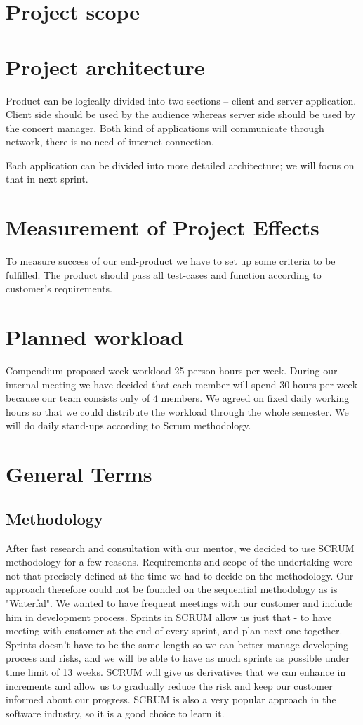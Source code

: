 \documentclass{article}
\begin{document}
\section{Project scope}


\section{Project architecture}
Product can be logically divided into two sections -- client and server application.
Client side should be used by the audience whereas server side should be used by the concert manager.
Both kind of applications will communicate through network, there is no need of internet connection.

Each application can be divided into more detailed architecture; we will focus on that in next sprint.


\section{Measurement of Project Effects}
To measure success of our end-product we have to set up some criteria to be fulfilled. The product should pass all test-cases and function according to customer's requirements.

\section{Planned workload}
Compendium proposed week workload 25 person-hours per week. During our internal meeting we have decided that each member will spend 30 hours per week because our team consists only of 4 members. We agreed on fixed daily working hours so that we could distribute the workload through the whole semester. We will do daily stand-ups according to Scrum methodology.

\section{General Terms}
\subsection{Methodology}
After fast research and consultation with our mentor, we decided to use SCRUM methodology for a 
few reasons. Requirements and scope of the undertaking were not that precisely defined at the time 
we had to decide on the methodology. Our approach therefore could not be founded on the sequential methodology as is "Waterfal".
We wanted to have frequent meetings with our customer and include him in development process. Sprints in SCRUM allow us just that - 
to have meeting with customer at the end of every sprint, and plan next one together. Sprints doesn't have to be the same length so 
we can better manage developing process and risks, and we will be able to have as much sprints as possible under time limit of 13 weeks. 
SCRUM will give us derivatives that we can enhance in increments and allow us to gradually reduce the risk and keep our customer informed 
about our progress. SCRUM is also a very popular approach in the software industry, so it is a good choice to learn it. 
\end{document}
